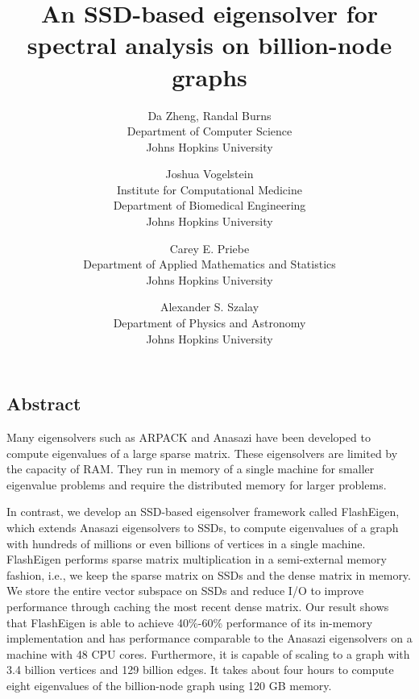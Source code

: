 \documentclass[letterpaper,twocolumn,10pt]{article}
\begin{document}
\date{}

\title{An SSD-based eigensolver for spectral analysis on billion-node graphs}

\author{
{\rm Da Zheng, Randal Burns}\\
Department of Computer Science \\
Johns Hopkins University
\and
{\rm Joshua Vogelstein}\\
Institute for Computational Medicine \\
Department of Biomedical Engineering \\
Johns Hopkins University
\and
{\rm Carey E. Priebe}\\
Department of Applied Mathematics and Statistics \\
Johns Hopkins University
\and
{\rm Alexander S. Szalay}\\
Department of Physics and Astronomy \\
Johns Hopkins University
} %

\maketitle

\thispagestyle{empty}


\subsection*{Abstract}
Many eigensolvers such as ARPACK and Anasazi have been developed to compute
eigenvalues of a large sparse matrix. These eigensolvers are limited by
the capacity of RAM. They run in memory of a single machine for smaller
eigenvalue problems and require the distributed memory for larger problems.

In contrast, we develop an SSD-based eigensolver framework called FlashEigen,
which extends Anasazi eigensolvers to SSDs, to compute eigenvalues of a graph
with hundreds of millions or even billions of vertices in a single machine.
FlashEigen performs sparse matrix multiplication in a semi-external memory
fashion, i.e., we keep the sparse matrix on SSDs and the dense matrix in memory.
We store the entire vector subspace on SSDs and reduce I/O to improve
performance through caching the most recent dense matrix.
Our result shows that FlashEigen is able to achieve 40\%-60\% performance
of its in-memory implementation and has performance comparable to the Anasazi
eigensolvers on a machine with 48 CPU cores. Furthermore, it is capable of
scaling to a graph with 3.4 billion vertices and 129 billion edges. It takes
about four hours to compute eight eigenvalues of the billion-node graph using
120 GB memory.
\end{document}
